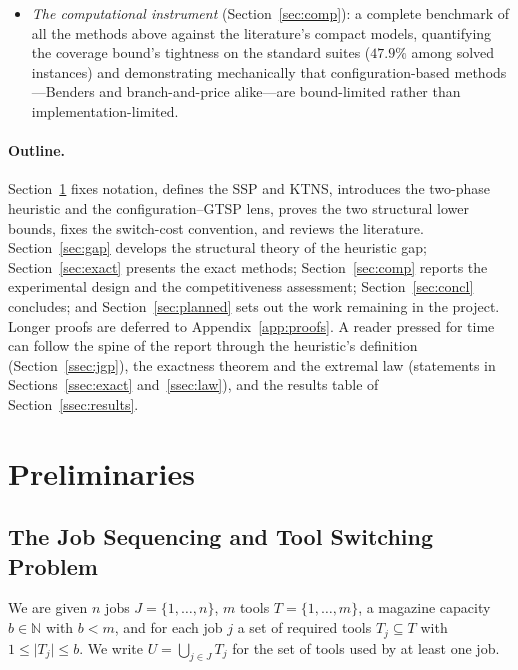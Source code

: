 \documentclass[11pt,a4paper]{article}
\theoremstyle{plain}
\theoremstyle{definition}
\theoremstyle{remark}
\newcommand{\U}{U}
\newcommand{\rset}[1]{\{#1\}}
\begin{document}
\begin{itemize}[noitemsep,topsep=2pt]
  solver whose subproblem is the polynomial KTNS oracle; and position-indexed
  formulations (PCF, its symmetry-reduced
  variant PCF$'$, and the transition model PTF) with a fixed $O(n\lvert T\rvert)$ row
  set, their pricing subproblems, and an exact branch-and-price.
  \item \emph{The computational instrument} (Section~\ref{sec:comp}): a complete
  benchmark of all the methods above against the literature's compact models,
  quantifying the coverage bound's tightness on the standard suites ($47.9\%$
  among solved instances) and demonstrating mechanically that configuration-based
  methods---Benders and branch-and-price alike---are bound-limited rather than
  implementation-limited.
\end{itemize}

\paragraph{Outline.}
Section~\ref{sec:prelim} fixes notation, defines the SSP and KTNS, introduces the
two-phase heuristic and the configuration--GTSP lens, proves the two structural
lower bounds, fixes the switch-cost convention, and reviews the literature.
Section~\ref{sec:gap} develops the structural theory of the heuristic gap;
Section~\ref{sec:exact} presents the exact methods; Section~\ref{sec:comp} reports
the experimental design and the competitiveness
assessment; Section~\ref{sec:concl} concludes; and Section~\ref{sec:planned} sets
out the work remaining in the project. Longer proofs are deferred to
Appendix~\ref{app:proofs}. A reader pressed for time can follow the spine of the
report through the heuristic's definition (Section~\ref{ssec:jgp}), the exactness
theorem and the extremal law (statements in Sections~\ref{ssec:exact}
and~\ref{ssec:law}), and the results table of Section~\ref{ssec:results}.

\section{Preliminaries}\label{sec:prelim}

\subsection{The Job Sequencing and Tool Switching Problem}\label{ssec:ssp}
We are given $n$ jobs $J=\rset{1,\dots,n}$, $m$ tools $T=\rset{1,\dots,m}$, a
magazine capacity $b\in\mathbb{N}$ with $b<m$, and for each job $j$ a set of
required tools $T_j\subseteq T$ with $1\le\lvert T_j\rvert\le b$. We write
$\U=\bigcup_{j\in J}T_j$ for the set of tools used by at least one job.
\end{document}
